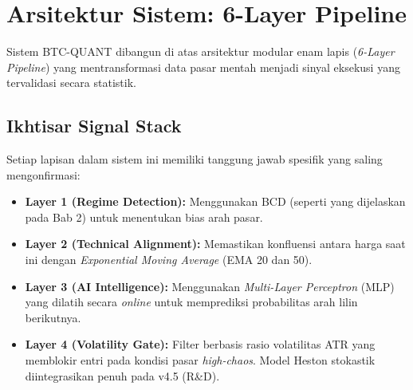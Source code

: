 \section{Arsitektur Sistem: 6-Layer Pipeline}
\label{sec:architecture}

Sistem BTC-QUANT dibangun di atas arsitektur modular enam lapis (\textit{6-Layer Pipeline}) yang mentransformasi data pasar mentah menjadi sinyal eksekusi yang tervalidasi secara statistik.

 \subsection{Ikhtisar Signal Stack}
Setiap lapisan dalam sistem ini memiliki tanggung jawab spesifik yang saling mengonfirmasi:
\begin{itemize}
    \item \textbf{Layer 1 (Regime Detection):} Menggunakan BCD (seperti yang dijelaskan pada Bab 2) untuk menentukan bias arah pasar.
    \item \textbf{Layer 2 (Technical Alignment):} Memastikan konfluensi antara harga saat ini dengan \textit{Exponential Moving Average} (EMA 20 dan 50).
    \item \textbf{Layer 3 (AI Intelligence):} Menggunakan \textit{Multi-Layer Perceptron} (MLP) yang dilatih secara \textit{online} untuk memprediksi probabilitas arah lilin berikutnya.
    \item \textbf{Layer 4 (Volatility Gate):} Filter berbasis rasio volatilitas ATR yang memblokir entri pada kondisi pasar \textit{high-chaos}. Model Heston stokastik diintegrasikan penuh pada v4.5 (R\&D).
\end{itemize}

